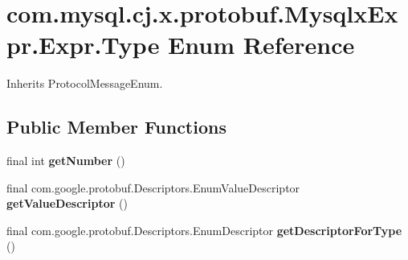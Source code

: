 \hypertarget{enumcom_1_1mysql_1_1cj_1_1x_1_1protobuf_1_1_mysqlx_expr_1_1_expr_1_1_type}{}\section{com.\+mysql.\+cj.\+x.\+protobuf.\+Mysqlx\+Expr.\+Expr.\+Type Enum Reference}
\label{enumcom_1_1mysql_1_1cj_1_1x_1_1protobuf_1_1_mysqlx_expr_1_1_expr_1_1_type}


Inherits Protocol\+Message\+Enum.

\subsection*{Public Member Functions}
\begin{DoxyCompactItemize}
\item 
\mbox{\label{enumcom_1_1mysql_1_1cj_1_1x_1_1protobuf_1_1_mysqlx_expr_1_1_expr_1_1_type_a7bc8dc0159e8a1939fc20832392e9976}} 
final int {\bfseries get\+Number} ()
\item 
\mbox{\label{enumcom_1_1mysql_1_1cj_1_1x_1_1protobuf_1_1_mysqlx_expr_1_1_expr_1_1_type_abaab9b8e3d3de11a7c0256537d9661d1}} 
final com.\+google.\+protobuf.\+Descriptors.\+Enum\+Value\+Descriptor {\bfseries get\+Value\+Descriptor} ()
\item 
\mbox{\label{enumcom_1_1mysql_1_1cj_1_1x_1_1protobuf_1_1_mysqlx_expr_1_1_expr_1_1_type_a6198f920054e8b55e74d891f79996bc1}} 
final com.\+google.\+protobuf.\+Descriptors.\+Enum\+Descriptor {\bfseries get\+Descriptor\+For\+Type} ()
\end{DoxyCompactItemize}
